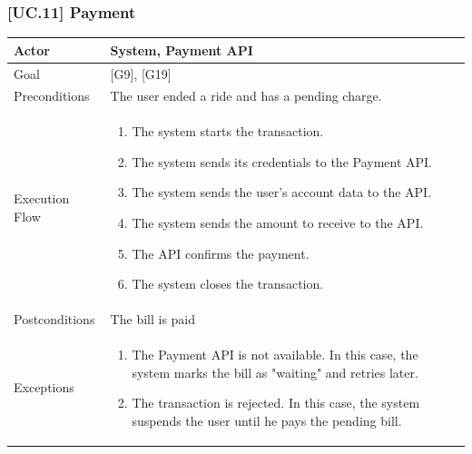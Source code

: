 \documentclass[english]{article}
\begin{document}
			\subsubsection{[UC.11] Payment}
			\begin{tabularx}{\textwidth}{  l  X  }
				\hline
				Actor & System, Payment API\\
				\hline
				Goal & [G9], [G19]\\
				\hline
				Preconditions & The user ended a ride and has a pending charge.\\
				\hline
				Execution Flow & \begin{enumerate}
					\item{The system starts the transaction.}
					\item{The system sends its credentials to the Payment API.}
					\item{The system sends the user's account data to the API.}
					\item{The system sends the amount to receive to the API.}
					\item{The API confirms the payment.}
					\item{The system closes the transaction.}
				\end{enumerate}\\
				\hline
				Postconditions & The bill is paid\\
				\hline
				Exceptions & \begin{enumerate}
					\item{The Payment API is not available. In this case, the system marks the bill as "waiting" and retries later.}
					\item{The transaction is rejected. In this case, the system suspends the user until he pays the pending bill.}
				\end{enumerate}\\
				\hline
			\end{tabularx}
\end{document}
